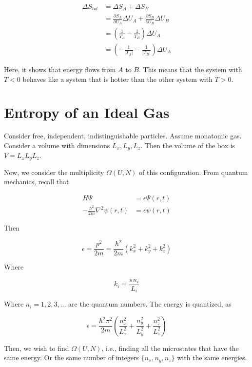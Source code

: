 \documentclass{article}
\newtheorem{one minute paper}[theorem]{One Minute Paper}
\begin{document}
\begin{align}
    \Delta S_{tot} &= \Delta S_{A} + \Delta S_{B}\\
    &= \frac{\partial S_A}{\partial U_A} \Delta U_A + \frac{\partial S_B}{\partial U_B} \Delta U_B \\
    &= \left( \frac{1}{T_A} - \frac{1}{T_B}\right)\Delta U_A \\
    &= \left( -\frac{1}{|T_A|} - \frac{1}{|T_B|} \right)\Delta U_A
\end{align}

Here, it shows that energy flows from $A$ to $B$. This means that the system with $T<0$ behaves like a system that is hotter than the other system with $T>0$. 

\newpage

\section*{Entropy of an Ideal Gas}

Consider free, independent, indistinguishable particles. Assume monatomic gas. Consider a volume with dimensions $L_x, L_y, L_z$. Then the volume of the box is $V=L_xL_yL_z$.

Now, we consider the multiplicity $\Omega(U,N)$ of this configuration. From quantum mechanics, recall that 

\begin{align}
    H\Psi &= \epsilon \Psi(r,t)\\
    -\frac{\hbar^2}{2m}\nabla^2 \psi(r,t) &= \epsilon\psi(r,t) 
\end{align}

Then 

\begin{equation}
    \epsilon = \frac{p^2}{2m} = \frac{\hbar^2}{2m}\left( k_x^2 + k_y^2 + k_z^2 \right)
\end{equation}

Where

\begin{equation}
    k_i = \frac{\pi n_i}{L_i}
\end{equation}

Where $n_i = 1,2,3,\dots$ are the quantum numbers. The energy is quantized, as 

\begin{equation}
    \epsilon = \frac{\hbar^2\pi^2}{2m}\left( \frac{n_x^2}{L_x^2} + \frac{n_y^2}{L_y^2} + \frac{n_z^2}{L_z^2} \right)
\end{equation}

Then, we wish to find $\Omega(U,N)$, i.e., finding all the microstates that have the same energy. Or the same number of integers $\{n_x,n_y,n_z\}$ with the same energies. 
\end{document}
